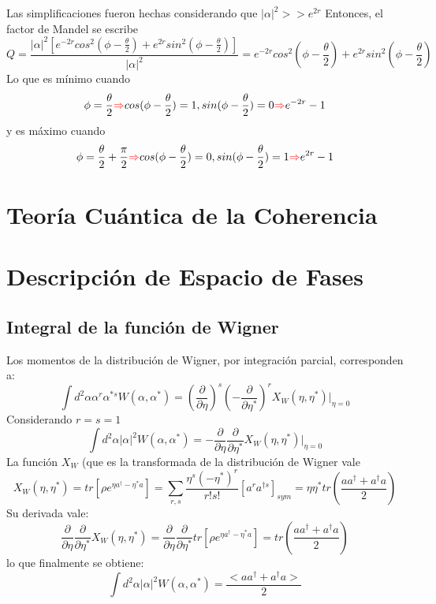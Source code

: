\documentclass{book}
\begin{document}
   Las simplificaciones fueron hechas considerando que $ {\lvert\alpha\rvert^2>>e^{2r}}$ Entonces, el factor de Mandel se escribe \begin{equation}{Q=\frac{\lvert\alpha\rvert^2[e^{-2r}cos^2(\phi-\frac{\theta}{2})+e^{2r}sin^2(\phi-\frac{\theta}{2})]}{ \lvert\alpha\rvert^2}=e^{-2r}cos^2(\phi-\frac{\theta}{2})+e^{2r}sin^2(\phi-\frac{\theta}{2})} \end{equation}
   Lo que es mínimo cuando \begin{equation}{\phi=\frac{\theta}{2}\textcolor{red}{\Rightarrow} cos(\phi-\frac{\theta}{2})=1, sin(\phi-\frac{\theta}{2})=0\textcolor{red}{\Rightarrow} e^{-2r}-1} \end{equation}
   y es máximo cuando \begin{equation}{\phi=\frac{\theta}{2}+\frac{\pi}{2}\textcolor{red}{\Rightarrow} cos(\phi-\frac{\theta}{2})=0, sin(\phi-\frac{\theta}{2})=1\textcolor{red}{\Rightarrow} e^{2r}-1} \end{equation}
   \section{Teoría Cuántica de la Coherencia}
   \section{Descripción de Espacio de Fases}
       \subsection{Integral de la función de Wigner} Los momentos de la distribución de Wigner, por integración parcial, corresponden a:
       \begin{equation}{ \int d^2\alpha \alpha^r\alpha^{*s}W(\alpha,\alpha^*)=(\frac{\partial}{\partial \eta})^s(-\frac{\partial}{\partial\eta^*})^rX_W(\eta,\eta^*)|_{\eta=0}}\end{equation}
       Considerando ${r=s=1}$
    \begin{equation}{ \int d^2\alpha \lvert\alpha\rvert^2 W(\alpha,\alpha^*)=-\frac{\partial}{\partial\eta}\frac{\partial}{\partial\eta^*}X_W(\eta,\eta^*)|_{\eta=0} }\end{equation}
    La función ${X_W}$ (que es la transformada de la distribución de Wigner vale 
    \begin{equation}{X_W(\eta,\eta^*)=tr[\rho e^{\eta a^\dag-\eta^* a}]=\sum_{r,s}\frac{\eta^s(-\eta^{*})^{r}}{r!s!}[a^ra^{\dag s}]_{sym}=\eta\eta^*tr(\frac{aa^\dag+a^\dag a}{2})} \end{equation} Su derivada vale:
    \begin{equation}{\frac{\partial}{\partial \eta}\frac{\partial}{\partial \eta^*}X_W(\eta,\eta^*)=\frac{\partial}{\partial \eta}\frac{\partial}{\partial \eta^*}tr[\rho e^{\eta a^\dag-\eta^* a}]=tr(\frac{aa^\dag+a^\dag a}{2})} \end{equation} lo que finalmente se obtiene:
       \begin{equation}{ \int d^2\alpha \lvert\alpha\rvert^2 W(\alpha,\alpha^*)=\frac{<aa^\dag+a^\dag a>}{2}} \end{equation}
\end{document}
